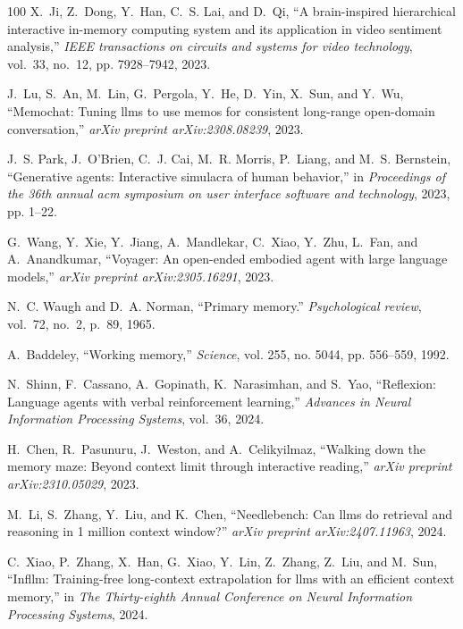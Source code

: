 \documentclass[10pt,journal,compsoc]{IEEEtran}
\begin{document}
\begin{thebibliography}{100}
	X.~Ji, Z.~Dong, Y.~Han, C.~S. Lai, and D.~Qi, ``A brain-inspired hierarchical
	interactive in-memory computing system and its application in video sentiment
	analysis,'' \emph{IEEE transactions on circuits and systems for video
		technology}, vol.~33, no.~12, pp. 7928--7942, 2023.
	
	J.~Lu, S.~An, M.~Lin, G.~Pergola, Y.~He, D.~Yin, X.~Sun, and Y.~Wu, ``Memochat:
	Tuning llms to use memos for consistent long-range open-domain
	conversation,'' \emph{arXiv preprint arXiv:2308.08239}, 2023.
	
	J.~S. Park, J.~O'Brien, C.~J. Cai, M.~R. Morris, P.~Liang, and M.~S. Bernstein,
	``Generative agents: Interactive simulacra of human behavior,'' in
	\emph{Proceedings of the 36th annual acm symposium on user interface software
		and technology}, 2023, pp. 1--22.
	
	G.~Wang, Y.~Xie, Y.~Jiang, A.~Mandlekar, C.~Xiao, Y.~Zhu, L.~Fan, and
	A.~Anandkumar, ``Voyager: An open-ended embodied agent with large language
	models,'' \emph{arXiv preprint arXiv:2305.16291}, 2023.
	
	N.~C. Waugh and D.~A. Norman, ``Primary memory.'' \emph{Psychological review},
	vol.~72, no.~2, p.~89, 1965.
	
	A.~Baddeley, ``Working memory,'' \emph{Science}, vol. 255, no. 5044, pp.
	556--559, 1992.
	
	N.~Shinn, F.~Cassano, A.~Gopinath, K.~Narasimhan, and S.~Yao, ``Reflexion:
	Language agents with verbal reinforcement learning,'' \emph{Advances in
		Neural Information Processing Systems}, vol.~36, 2024.
	
	H.~Chen, R.~Pasunuru, J.~Weston, and A.~Celikyilmaz, ``Walking down the memory
	maze: Beyond context limit through interactive reading,'' \emph{arXiv
		preprint arXiv:2310.05029}, 2023.
	
	M.~Li, S.~Zhang, Y.~Liu, and K.~Chen, ``Needlebench: Can llms do retrieval and
	reasoning in 1 million context window?'' \emph{arXiv preprint
		arXiv:2407.11963}, 2024.
	
	C.~Xiao, P.~Zhang, X.~Han, G.~Xiao, Y.~Lin, Z.~Zhang, Z.~Liu, and M.~Sun,
	``Infllm: Training-free long-context extrapolation for llms with an efficient
	context memory,'' in \emph{The Thirty-eighth Annual Conference on Neural
		Information Processing Systems}, 2024.
	

\end{thebibliography}
\end{document}
